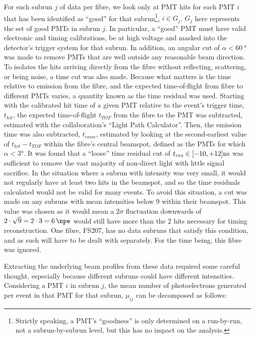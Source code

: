 For each subrun $j$ of data per fibre, we look only at PMT hits for each PMT $i$ that has been identified as ``good'' for that subrun\footnote{Strictly speaking, a PMT's ``goodness'' is only determined on a run-by-run, not a subrun-by-subrun level, but this has no impact on the analysis.}, $i \in G_{j}$. $G_{j}$ here represents the set of good PMTs in subrun $j$. In particular, a ``good'' PMT must have valid electronic and timing calibrations, be at high voltage and masked into the detector's trigger system for that subrun. In addition, an angular cut of $\alpha < \SI{60}{\degree}$ was made to remove PMTs that are well outside any reasonable beam direction. To isolates the hits arriving directly from the fibre without reflecting, scattering, or being noise, a time cut was also made. Because what matters is the time relative to emission from the fibre, and the expected time-of-flight from fibre to different PMTs varies, a quantity known as the time residual was used. Starting with the calibrated hit time of a given PMT relative to the event's trigger time, $t_{hit}$, the expected time-of-flight $t_{TOF}$ from the fibre to the PMT was subtracted, estimated with the collaboration's ``Light Path Calculator''. Then, the emission time was also subtracted, $t_{emm}$, estimated by looking at the second-earliest value of $t_{hit}-t_{TOF}$ within the fibre's central beamspot, defined as the PMTs for which $\alpha<\ang{3}$. It was found that a ``loose'' time residual cut of $t_{res} \in [-10, +12] \si[]{\nano\second}$ was sufficient to remove the vast majority of non-direct light with little signal sacrifice. In the situation where a subrun with intensity was very small, it would not regularly have at least two hits in the beamspot, and so the time residuals calculated would not be valid for many events. To avoid this situation, a cut was made on any subruns with mean intensities below 9 within their beamspot. This value was chosen as it would mean a $2\sigma$ fluctuation downwards of $2\cdot\sqrt{9}=2\cdot3=\SI{6}{\npe}$ would still have more than the 2 hits necessary for timing reconstruction. One fibre, FS207, has no data subruns that satisfy this condition, and as such will have to be dealt with separately. For the time being, this fibre was ignored.

Extracting the underlying beam profiles from these data required some careful thought, especially because different subruns could have different intensities. Considering a PMT $i$ in subrun $j$, the mean number of photoelectrons generated per event in that PMT for that subrun, $\mu_{ij}$ can be decomposed as follows:

